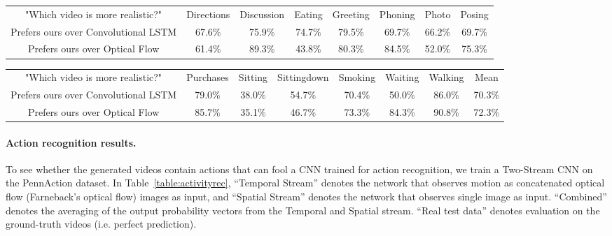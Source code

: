 \documentclass{article}
\begin{document}
\begin{table*}[!hbt]
\centering
\small
\setlength{\tabcolsep}{3pt}
\begin{tabular}{c|ccccccc}
\Xhline{4\arrayrulewidth}
"Which video is more realistic?" & Directions & Discussion & Eating & Greeting & Phoning & Photo & Posing \\
\Xhline{4\arrayrulewidth}
Prefers ours over Convolutional LSTM & 67.6\% & 75.9\% & 74.7\% & 79.5\% & 69.7\% & 66.2\% & 69.7\%\\
Prefers ours over Optical Flow & 61.4\% & 89.3\% & 43.8\% & 80.3\% & 84.5\% & 52.0\% & 75.3\%\\
\end{tabular}
\setlength{\tabcolsep}{3pt}
\begin{tabular}{c|cccccc|c}
\Xhline{4\arrayrulewidth}
"Which video is more realistic?" & Purchases & Sitting & Sittingdown & Smoking & Waiting & Walking & Mean \\
\Xhline{4\arrayrulewidth}
Prefers ours over Convolutional LSTM & 79.0\% & 38.0\% & 54.7\% & 70.4\% & 50.0\% & 86.0\% & 70.3\% \\
Prefers ours over Optical Flow & 85.7\% & 35.1\% & 46.7\% & 73.3\% & 84.3\% & 90.8\% & 72.3\%\\
\end{tabular}
\caption{\textbf{Human3.6M Video Generation Preference:} We show videos from two methods to Amazon Mechanical Turk workers and ask them to indicate which of the the two looks more realistic. The table shows the percentage of times workers preferred our model against baselines. Most of the time workers prefer predictions from our model. We merge the activity categories of walking, walking dog, and walking together into walking.}
 \label{table:human}
 \vspace{-10pt}
\end{table*}\vspace{-8pt}\paragraph{Action recognition results.} 
To see whether the generated videos contain actions that can fool a CNN trained for action recognition, we train a Two-Stream CNN on the PennAction dataset.
In Table~\ref{table:activityrec}, ``Temporal Stream'' denotes the network that observes motion as concatenated optical flow (Farneback's optical flow) images as input, and ``Spatial Stream'' denotes the network that observes single image as input.
``Combined'' denotes the averaging of the output probability vectors from the Temporal and Spatial stream.
``Real test data'' denotes evaluation on the ground-truth videos (i.e. perfect prediction).
\end{document}
